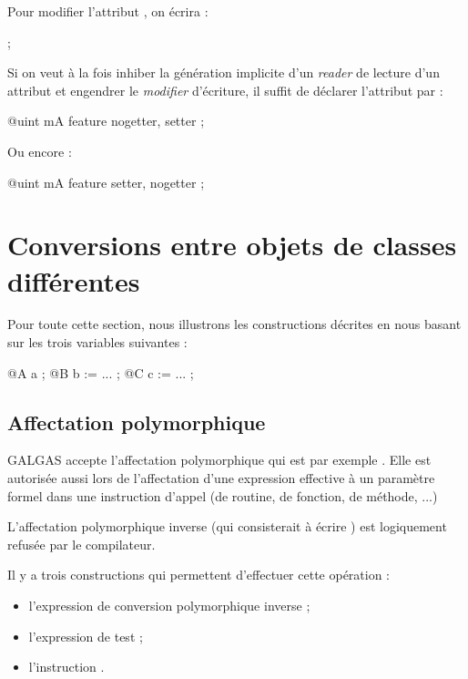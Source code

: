 Pour modifier l'attribut , on écrira :

\begin{galgascode}
[!?b setMA !12] ;
\end{galgascode}

Si on veut à la fois inhiber la génération implicite d'un \emph{reader} de lecture d'un attribut et engendrer le \emph{modifier} d'écriture, il suffit de déclarer l'attribut par :

\begin{galgascode}
  @uint mA feature nogetter, setter ;
\end{galgascode}

Ou encore :

\begin{galgascode}
  @uint mA feature setter, nogetter ;
\end{galgascode}












\section{Conversions entre objets de classes différentes}

Pour toute cette section, nous illustrons les constructions décrites en nous basant sur les trois variables suivantes :

\begin{galgascode}
@A a ;
@B b := ... ;
@C c := ... ;
\end{galgascode}

\subsection{Affectation polymorphique}

GALGAS accepte l'affectation polymorphique qui est par exemple . Elle est autorisée aussi lors de l'affectation d'une expression effective à un paramètre formel dans une instruction d'appel (de routine, de fonction, de méthode, ...)

L'affectation polymorphique inverse (qui consisterait à écrire ) est logiquement refusée par le compilateur.

Il y a trois constructions qui permettent d'effectuer cette opération :
\begin{itemize}
  \item l'expression de conversion polymorphique inverse ;
  \item l'expression de test ;
  \item l'instruction .
\end{itemize}

